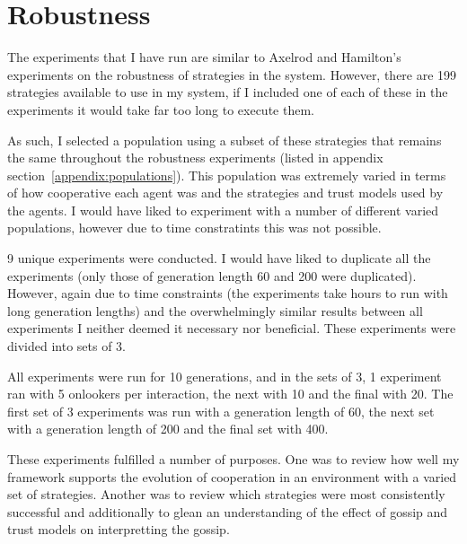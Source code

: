 \documentclass[]{final_report}
\begin{document}
\section{Robustness}
The experiments that I have run are similar to Axelrod and Hamilton's~\cite{evolution_of_cooperation} experiments on the robustness of strategies in the system. However, there are 199 strategies available to use in my system, if I included one of each of these in the experiments it would take far too long to execute them.\par 
As such, I selected a population using a subset of these strategies that remains the same throughout the robustness experiments (listed in appendix section~\ref{appendix:populations}). This population was extremely varied in terms of how cooperative each agent was and the strategies and trust models used by the agents. I would have liked to experiment with a number of different varied populations, however due to time constratints this was not possible.\par 
9 unique experiments were conducted. I would have liked to duplicate all the experiments (only those of generation length 60 and 200 were duplicated). However, again due to time constraints (the experiments take hours to run with long generation lengths) and the overwhelmingly similar results between all experiments I neither deemed it necessary nor beneficial. These experiments were divided into sets of 3.\par 
All experiments were run for 10 generations, and in the sets of 3, 1 experiment ran with 5 onlookers per interaction, the next with 10 and the final with 20. The first set of 3 experiments was run with a generation length of 60, the next set with a generation length of 200 and the final set with 400.\par
These experiments fulfilled a number of purposes. One was to review how well my framework supports the evolution of cooperation in an environment with a varied set of strategies. Another was to review which strategies were most consistently successful and additionally to glean an understanding of the effect of gossip and trust models on interpretting the gossip.
\end{document}
